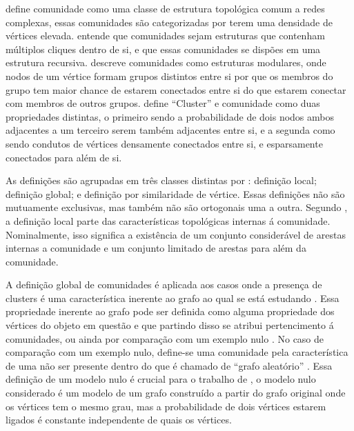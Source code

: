 \documentclass[notes.tex]{subfiles}
\begin{document}
 define comunidade como uma classe de estrutura topológica comum a redes complexas, essas comunidades são categorizadas por terem uma densidade de vértices elevada.
 entende que comunidades sejam estruturas que contenham múltiplos cliques dentro de si, e que essas comunidades se dispões em uma estrutura recursiva.
 descreve comunidades como estruturas modulares, onde nodos de um vértice formam grupos distintos entre si por que os membros do grupo tem maior chance de estarem conectados entre si do que estarem conectar com membros de outros grupos.
 define ``Cluster'' e comunidade como duas propriedades distintas, o primeiro sendo a probabilidade de dois nodos ambos adjacentes a um terceiro serem também adjacentes entre si, e a segunda como sendo condutos de vértices densamente conectados entre si, e esparsamente conectados para além de si.

As definições são agrupadas em três classes distintas por : definição local; definição global; e definição por similaridade de vértice.
Essas definições não são mutuamente exclusivas, mas também não são ortogonais uma a outra.
Segundo , a definição local parte das características topológicas internas á comunidade.
Nominalmente, isso significa a existência de um conjunto considerável de arestas internas a comunidade e um conjunto limitado de arestas para além da comunidade.

A definição global de comunidades é aplicada aos casos onde a presença de clusters é uma característica inerente ao grafo ao qual se está estudando .
Essa propriedade inerente ao grafo pode ser definida como alguma propriedade dos vértices do objeto em questão e que partindo disso se atribui pertencimento á comunidades, ou ainda por comparação com um exemplo nulo .
No caso de comparação com um exemplo nulo, define-se uma comunidade pela característica de uma não ser presente dentro do que é chamado de ``grafo aleatório'' \cite{fortunato2010community}.
Essa definição de um modelo nulo é crucial para o trabalho de , o modelo nulo considerado é um modelo de um grafo construído a partir do grafo original onde os vértices tem o mesmo grau, mas a probabilidade de dois vértices estarem ligados é constante independente de quais os vértices.
\end{document}
